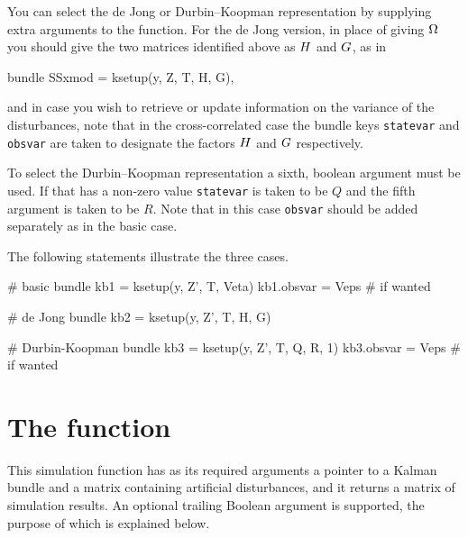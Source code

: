 You can select the de Jong or Durbin--Koopman representation by
supplying extra arguments to the  function. For the de
Jong version, in place of giving $\Omega$ you should give the two
matrices identified above as $H$ and $G$, as in
\begin{code}
bundle SSxmod = ksetup(y, Z, T, H, G),
\end{code}
and in case you wish to retrieve or update information on the variance of
the disturbances, note that in the cross-correlated case the bundle
keys \texttt{statevar} and \texttt{obsvar} are taken to designate the
factors $H$ and $G$ respectively.

To select the Durbin--Koopman representation a sixth, boolean
argument must be used. If that has a non-zero value \texttt{statevar}
is taken to be $Q$ and the fifth argument is taken to be $R$. Note
that in this case \texttt{obsvar} should be added separately as in the
basic case.

The following statements illustrate the three cases.

\begin{code}
# basic
bundle kb1 = ksetup(y, Z', T, Veta)
kb1.obsvar = Veps # if wanted

# de Jong
bundle kb2 = ksetup(y, Z', T, H, G)

# Durbin-Koopman
bundle kb3 = ksetup(y, Z', T, Q, R, 1)
kb3.obsvar = Veps # if wanted
\end{code}

\section{The  function}
\label{sec:ksimul}

This simulation function has as its required arguments a pointer to a
Kalman bundle and a matrix containing artificial disturbances, and it
returns a matrix of simulation results. An optional trailing Boolean
argument is supported, the purpose of which is explained below.

